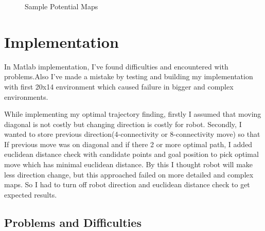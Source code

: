 \documentclass{article}
\begin{document}
\begin{figure}[ht!]
\centering
{}
\caption{Sample Potential Maps}
\end{figure}

\section{Implementation}

	In Matlab implementation, I've found difficulties and encountered with problems.Also I've made a mistake by testing and building my implementation with first 20x14 environment which caused failure in bigger and complex environments. \par
	While implementing my optimal trajectory finding, firstly I assumed that moving diagonal is not costly but changing direction is costly for robot. Secondly, I wanted to store previous direction(4-connectivity or 8-connectivity move) so that If previous move was on diagonal and if there 2 or more optimal path, I added euclidean distance check with candidate points and goal position to pick optimal move which has minimal euclidean distance. By this I thought robot will make less direction change, but this approached failed on more detailed and complex maps. So I had to turn off robot direction and euclidean distance check to get expected results.

	\subsection{Problems and Difficulties}
	
\end{document}
